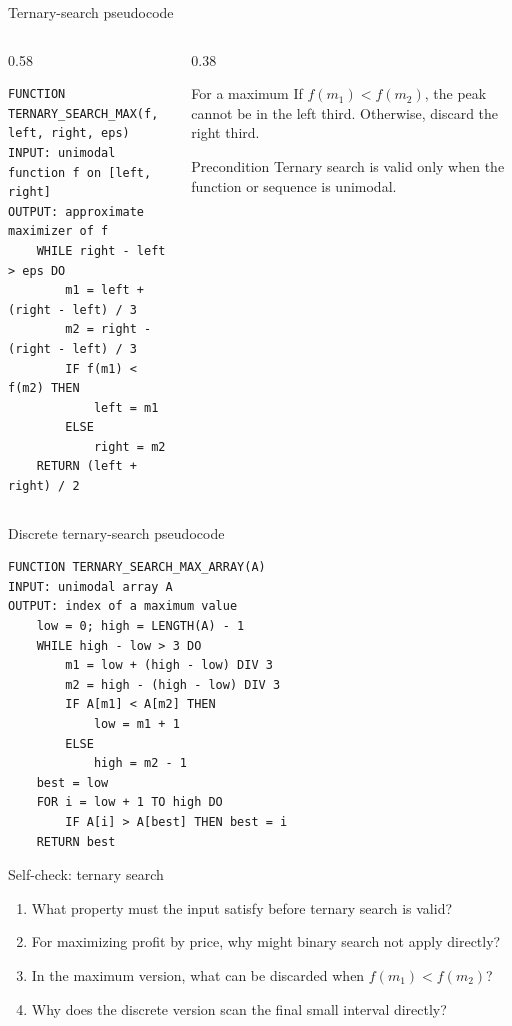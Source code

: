 \documentclass[aspectratio=169]{beamer}
\begin{document}
\begin{frame}[fragile]{Ternary-search pseudocode}
  \small
  \begin{columns}[T]
    \begin{column}{0.58\textwidth}
\begin{lstlisting}[style=pseudonumbered]
FUNCTION TERNARY_SEARCH_MAX(f, left, right, eps)
INPUT: unimodal function f on [left, right]
OUTPUT: approximate maximizer of f
    WHILE right - left > eps DO
        m1 = left + (right - left) / 3
        m2 = right - (right - left) / 3
        IF f(m1) < f(m2) THEN
            left = m1
        ELSE
            right = m2
    RETURN (left + right) / 2
\end{lstlisting}
    \end{column}
    \begin{column}{0.38\textwidth}
      \begin{block}{For a maximum}
        If $f(m_1)<f(m_2)$, the peak cannot be in the left third. Otherwise,
        discard the right third.
      \end{block}
      \begin{alertblock}{Precondition}
        Ternary search is valid only when the function or sequence is unimodal.
      \end{alertblock}
    \end{column}
  \end{columns}
\end{frame}

\begin{frame}[fragile]{Discrete ternary-search pseudocode}
  \small
\begin{lstlisting}[style=pseudonumbered]
FUNCTION TERNARY_SEARCH_MAX_ARRAY(A)
INPUT: unimodal array A
OUTPUT: index of a maximum value
    low = 0; high = LENGTH(A) - 1
    WHILE high - low > 3 DO
        m1 = low + (high - low) DIV 3
        m2 = high - (high - low) DIV 3
        IF A[m1] < A[m2] THEN
            low = m1 + 1
        ELSE
            high = m2 - 1
    best = low
    FOR i = low + 1 TO high DO
        IF A[i] > A[best] THEN best = i
    RETURN best
\end{lstlisting}
\end{frame}

\begin{frame}{Self-check: ternary search}
  \small
  \begin{enumerate}
    \item What property must the input satisfy before ternary search is valid?
    \item For maximizing profit by price, why might binary search not apply directly?
    \item In the maximum version, what can be discarded when $f(m_1)<f(m_2)$?
    \item Why does the discrete version scan the final small interval directly?
  \end{enumerate}
\end{frame}
\end{document}
